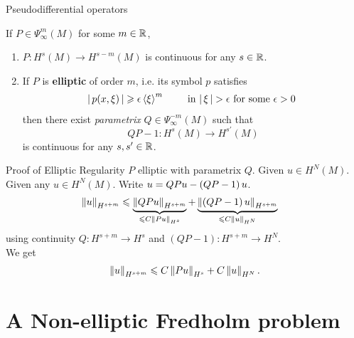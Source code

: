 \documentclass{beamer}
\begin{document}
\begin{frame}{Pseudodifferential operators}
\begin{lemma}
    If $P \in \Psi^{m}_{\infty}(M)$ for some $m \in \R$, 
    \begin{enumerate}
        \item $P : H^{s}(M) \to H^{s - m}(M)$ is continuous for any $s \in \R$. 
        \item If $P$ is \textbf{elliptic} of order $m$, i.e. its symbol $p$ satisfies
        \begin{align*}
        \abs{p(x, \xi)} \geq \epsilon \sym[\xi]^m \tag*{ in $\abs{\xi} > \epsilon$ for some $\epsilon > 0$ } 
        \end{align*}
        then there exist \textit{parametrix} $Q \in \Psi^{-m}_{\infty}(M)$ such that 
        $$QP - 1: H^{s}(M) \to H^{s'}(M)$$
         is continuous for any $s, s' \in \R$. 
    \end{enumerate}
\end{lemma}
\end{frame} 

\begin{frame}{Proof of Elliptic Regularity}
$P$ elliptic with parametrix $Q$. Given $u \in H^N(M)$. 
Given any $u \in H^N(M)$. Write $u = QP u -  \brac{QP - 1} u$. 
\begin{align*}
\norm[u]_{H^{s + m}} 
&\leq \underbrace{\norm[QPu]_{H^{s + m}}}_{\leq C \norm[Pu]_{H^s}} + \underbrace{\norm[\brac{QP - 1}u]_{H^{s +m}}}_{\leq C \norm[u]_{H^N}}
\end{align*}
using continuity $Q: H^{s +m} \to H^{s}$ and $(QP - 1): H^{s + m} \to H^{N}$.  \\
We get 
\begin{align*}
\norm[u]_{H^{s + m}} \leq C \norm[Pu]_{H^s} + C \norm[u]_{H^N}. 
\end{align*}
\end{frame} 


\section{A Non-elliptic Fredholm problem}
\end{document}
